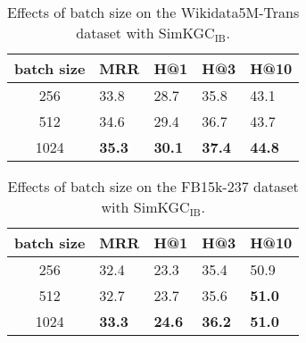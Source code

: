 \documentclass[11pt]{article}
\begin{document}
\begin{table}[ht]
\centering
\begin{tabular}{c|llll}
\hline
batch size & MRR & H@1 & H@3 & H@10 \\ \hline
256 &  33.8 & 28.7 & 35.8 & 43.1 \\
512 & 34.6 & 29.4 & 36.7 & 43.7 \\
1024 & \textbf{35.3} & \textbf{30.1} & \textbf{37.4} & \textbf{44.8} \\ \hline
\end{tabular}
\caption{Effects of batch size on the Wikidata5M-Trans dataset with SimKGC$_\text{IB}$.}
\label{tab:wiki5m_trans_batch_size}
\end{table}

\begin{table}[ht]
\centering
\begin{tabular}{c|llll}
\hline
batch size & MRR & H@1 & H@3 & H@10 \\ \hline
256 &  32.4 & 23.3 & 35.4 & 50.9 \\
512 & 32.7 & 23.7 & 35.6 & \textbf{51.0} \\
1024 & \textbf{33.3} & \textbf{24.6} & \textbf{36.2} & \textbf{51.0} \\ \hline
\end{tabular}
\caption{Effects of batch size on the FB15k-237 dataset with SimKGC$_\text{IB}$.}
\label{tab:fb_batch_size}
\end{table}

\begin{table}[ht]
\centering
{}
\caption{Ablation for the additive margin $\gamma$ of InfoNCE loss on the FB15k-237 dataset.}
\label{tab:fb_additive_margin}
\end{table}
\end{document}
